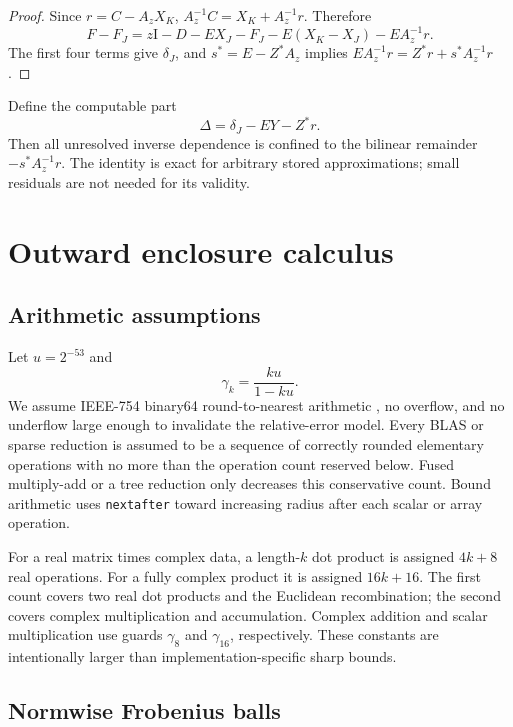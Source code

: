 \documentclass[11pt]{article}
\theoremstyle{definition}
\theoremstyle{remark}
\newcommand{\Id}{\mathrm I}
\begin{document}
\begin{proof}
Since \(r=C-A_zX_K\),
\(A_z^{-1}C=X_K+A_z^{-1}r\).  Therefore
\[
 F-F_J
 =z\Id-D-EX_J-F_J-E(X_K-X_J)-EA_z^{-1}r.
\]
The first four terms give \(\delta_J\), and
\(s^*=E-Z^*A_z\) implies
\(EA_z^{-1}r=Z^*r+s^*A_z^{-1}r\).
\end{proof}

Define the computable part
\begin{equation}
 \Delta=\delta_J-EY-Z^*r.
 \label{eq:computed-delta}
\end{equation}
Then all unresolved inverse dependence is confined to the bilinear
remainder \(-s^*A_z^{-1}r\).  The identity is exact for arbitrary stored
approximations; small residuals are not needed for its validity.

\section{Outward enclosure calculus}
\label{sec:enclosures}

\subsection{Arithmetic assumptions}

Let \(u=2^{-53}\) and
\begin{equation}
 \gamma_k=\frac{ku}{1-ku}.
 \label{eq:gamma}
\end{equation}
We assume IEEE-754 binary64 round-to-nearest arithmetic
\citep{IEEE7542019}, no overflow, and no underflow large enough to invalidate
the relative-error model.  Every BLAS or sparse reduction is assumed to be
a sequence of correctly rounded elementary operations with no more than the
operation count reserved below.  Fused multiply-add or a tree reduction
only decreases this conservative count.  Bound arithmetic uses
\texttt{nextafter} toward increasing radius after each scalar or array
operation.

For a real matrix times complex data, a length-\(k\) dot product is assigned
\(4k+8\) real operations.  For a fully complex product it is assigned
\(16k+16\).  The first count covers two real dot products and the Euclidean
recombination; the second covers complex multiplication and accumulation.
Complex addition and scalar multiplication use guards \(\gamma_8\) and
\(\gamma_{16}\), respectively.  These constants are intentionally larger
than implementation-specific sharp bounds.

\subsection{Normwise Frobenius balls}
\end{document}
